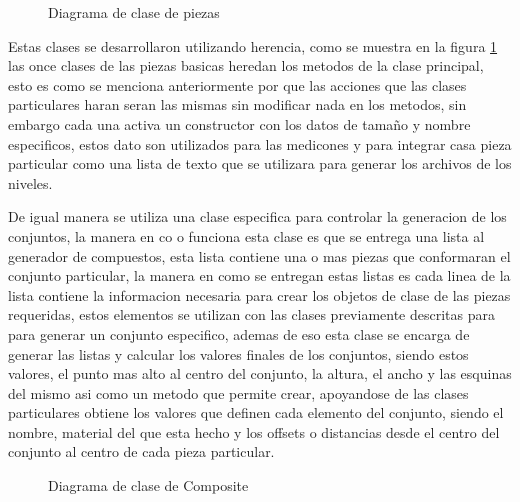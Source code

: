 \begin{figure}
  \centering
  \scalebox{.43}{}
  \caption{Diagrama de clase de piezas}
  \label{figure:pieces-class-diagram}
\end{figure}

Estas clases se desarrollaron utilizando herencia, como se muestra en la figura
\ref{figure:pieces-class-diagram} las once clases de las piezas basicas heredan
los metodos de la clase principal, esto es como se menciona anteriormente por
que las acciones que las clases particulares haran seran las mismas sin
modificar nada en los metodos, sin embargo cada una activa un constructor con
los datos de tamaño y nombre especificos, estos dato son utilizados para las
medicones y para integrar casa pieza particular como una lista de texto que se
utilizara para generar los archivos de los niveles.

De igual manera se utiliza una clase especifica para controlar la generacion de
los conjuntos, la manera en co o funciona esta clase es que se entrega una lista
al generador de compuestos, esta lista contiene una o mas piezas que conformaran
el conjunto particular, la manera en como se entregan estas listas es cada linea
de la lista contiene la informacion necesaria para crear los objetos de clase de
las piezas requeridas, estos elementos se utilizan con las clases previamente
descritas para para generar un conjunto especifico, ademas de eso esta clase se
encarga de generar las listas y calcular los valores finales de los conjuntos,
siendo estos valores, el punto mas alto al centro del conjunto, la altura, el
ancho y las esquinas del mismo asi como un metodo que permite crear, apoyandose
de las clases particulares obtiene los valores que definen cada elemento del
conjunto, siendo el nombre, material del que esta hecho y los offsets o
distancias desde el centro del conjunto al centro de cada pieza particular.

\begin{figure}
  \centering
  \scalebox{.65}{}
  \caption{Diagrama de clase de Composite}
  \label{figure:composite-class-diagram}
\end{figure}

